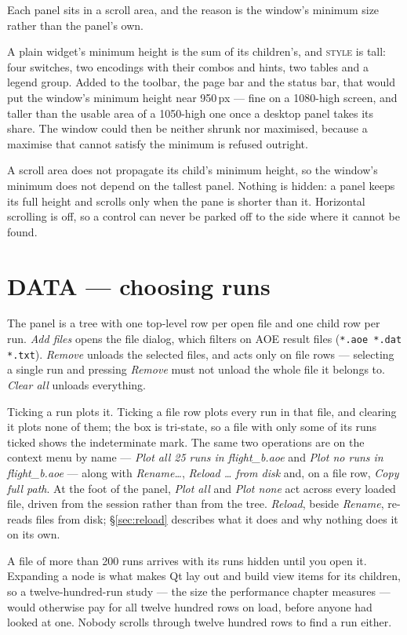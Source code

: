 \documentclass[11pt,a4paper,oneside]{report}
\newcommand{\code}[1]{\texttt{#1}}
\newcommand{\tab}[1]{\textsc{#1}}
\begin{document}
Each panel sits in a scroll area, and the reason is the window's minimum size
rather than the panel's own.

A plain widget's minimum height is the sum of its children's, and \tab{style} is
tall: four switches, two encodings with their combos and hints, two tables and a
legend group. Added to the toolbar, the page bar and the status bar, that would
put the window's minimum height near 950\,px --- fine on a 1080-high screen, and
taller than the usable area of a 1050-high one once a desktop panel takes its
share. The window could then be neither shrunk nor maximised, because a maximise
that cannot satisfy the minimum is refused outright.

A scroll area does not propagate its child's minimum height, so the window's
minimum does not depend on the tallest panel. Nothing is hidden: a panel keeps
its full height and scrolls only when the pane is shorter than it. Horizontal
scrolling is off, so a control can never be parked off to the side where it
cannot be found.

\section{DATA --- choosing runs}
\label{sec:data}

The panel is a tree with one top-level row per open file and one child row per
run. \emph{Add files} opens the file dialog, which filters on AOE result files
(\code{*.aoe *.dat *.txt}). \emph{Remove} unloads the selected files, and acts
only on file rows --- selecting a single run and pressing \emph{Remove} must not
unload the whole file it belongs to. \emph{Clear all} unloads everything.

Ticking a run plots it. Ticking a file row plots every run in that file, and
clearing it plots none of them; the box is tri-state, so a file with only some of
its runs ticked shows the indeterminate mark. The same two operations are on the
context menu by name --- \emph{Plot all 25 runs in flight\_b.aoe} and \emph{Plot
no runs in flight\_b.aoe} --- along with \emph{Rename\ldots}, \emph{Reload
\ldots{} from disk} and, on a file row, \emph{Copy full path}. At the foot of
the panel, \emph{Plot all} and \emph{Plot none} act across every loaded file,
driven from the session rather than from the tree. \emph{Reload}, beside
\emph{Rename}, re-reads files from disk; \S\ref{sec:reload} describes what it
does and why nothing does it on its own.

A file of more than 200 runs arrives with its runs hidden until you open it.
Expanding a node is what makes Qt lay out and build view items for its children,
so a twelve-hundred-run study --- the size the performance chapter measures ---
would otherwise pay for all twelve hundred rows on load, before anyone had
looked at one. Nobody scrolls through twelve hundred rows to find a run either.
\end{document}
